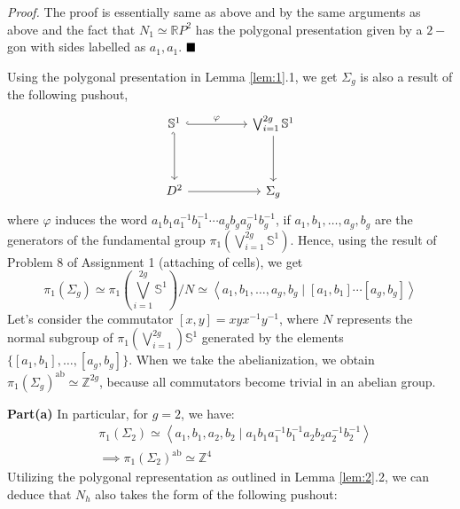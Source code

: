 \documentclass[11pt]{article}
\newcommand{\bb}[1]{\mathbb{#1}}
\newcommand{\s}{\bb{S}}
\begin{document}
 \noindent \textit{Proof.}   The proof is essentially same as above and by the same arguments as above and the fact that \( N_1 \simeq \mathbb{R}P^2 \) has the polygonal presentation given by a \( 2- \)gon with sides labelled as \( a_1, a_1 \). $\hfill \blacksquare$




 \noindent Using the polygonal presentation in Lemma \ref{lem:1}.1, we get \( \Sigma_g \) is also a result of the following pushout, 
 \[\begin{tikzcd}
    \mathbb{S}^1 && \bigvee_{i=1}^{2g} \mathbb{S}^1 \\
    \\
    D^2 && {\Sigma_{g}}
    \arrow[hook, "\varphi", from=1-1, to=1-3]
    \arrow[hook', from=1-1, to=3-1]
    \arrow[from=3-1, to=3-3]
    \arrow[from=1-3, to=3-3]
  \end{tikzcd}\]
  where \( \varphi \) induces the word \( a_1b_1a_1^{-1}b_1^{-1} \cdots a_gb_ga_g^{-1}b_g^{-1} \), if \( a_1, b_1, \dots, a_g, b_g \) are the generators of the fundamental group \( \pi_1(\bigvee_{i=1}^{2g} \mathbb{S}^1) \). Hence, using the result of Problem 8 of Assignment 1 (attaching of cells), we get
  \[
    \pi_1(\Sigma_g) \simeq \pi_1\left(\bigvee_{i=1}^{2g} \mathbb{S}^1\right) \Bigg/ N \simeq \left\langle {a_1, b_1, \dots, a_g, b_g} \mid {[a_1,b_1]\cdots [a_g,b_g]} \right\rangle
  \]
Let's consider the commutator \([x, y] = xyx^{-1}y^{-1}\), where \(N\) represents the normal subgroup of \(\pi_1(\bigvee_{i=1}^{2g})\s^1\) generated by the elements \(\{[a_1, b_1], \ldots, [a_g, b_g]\}\). When we take the abelianization, we obtain \({\pi_1(\Sigma_g)}^{\text{ab}} \simeq \mathbb{Z}^{2g}\), because all commutators become trivial in an abelian group.
  
\noindent \textbf{Part(a)} In particular, for \(g = 2\), we have:
\begin{align*}
    &\pi_1(\Sigma_2) \simeq \left\langle {a_1, b_1, a_2, b_2} \mid {a_1b_1a_1^{-1}b_1^{-1}a_2b_2a_2^{-1}b_2^{-1}} \right\rangle\\
     &\implies {\pi_1(\Sigma_2)}^{\text{ab}} \simeq \mathbb{Z}^{4}
\end{align*}
Utilizing the polygonal representation as outlined in Lemma \ref{lem:2}.2, we can deduce that \( N_h \) also takes the form of the following pushout:
\end{document}
